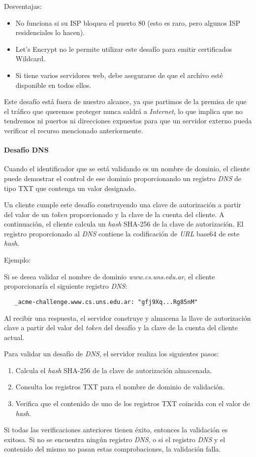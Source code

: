 Desventajas:
\begin{itemize}
   \setlength\itemsep{-0.6em}
   \item No funciona si su ISP bloquea el puerto 80 (esto es raro, pero algunos ISP residenciales lo hacen).
   \item Let's Encrypt no le permite utilizar este desafío para emitir certificados Wildcard.
   \item Si tiene varios servidores web, debe asegurarse de que el archivo esté disponible en todos ellos.
\end{itemize}
   
Este desafío está fuera de nuestro alcance, ya que partimos de la premisa de que 
el tráfico que queremos proteger nunca saldrá a \emph{Internet}, lo que implica que no 
tendremos ni puertos ni direcciones expuestas para que un servidor externo pueda 
verificar el recurso mencionado anteriormente. 


\paragraph*{Desafío DNS}
Cuando el identificador que se está validando es un nombre de dominio, el cliente 
puede demostrar el control de ese dominio proporcionando un registro \emph{DNS} de tipo 
TXT que contenga un valor designado.

Un cliente cumple este desafío construyendo una clave de autorización a partir del 
valor de un \emph{token} proporcionado y la clave de la cuenta del cliente. A continuación, el 
cliente calcula un \emph{hash} SHA-256 de la clave de 
autorización.
El registro proporcionado al \emph{DNS} contiene la codificación de \emph{URL} base64 de este 
\emph{hash}. 

\noindent Ejemplo:

Si se desea validar el nombre de dominio \textit{www.cs.uns.edu.ar}, el cliente 
proporcionaría el siguiente registro \emph{DNS}:

\begin{verbatim}
   _acme-challenge.www.cs.uns.edu.ar: "gfj9Xq...Rg85nM"
\end{verbatim}

Al recibir una respuesta, el servidor construye y almacena la llave de autorización
clave a partir del valor del \emph{token} del desafío y la clave de la cuenta del cliente actual.

\noindent Para validar un desafío de \emph{DNS}, el servidor realiza los siguientes pasos:

\begin{enumerate}
   \setlength\itemsep{-0.6em}
   \item Calcula el \emph{hash} SHA-256 de la clave de autorización almacenada.
   \item Consulta los registros TXT para el nombre de dominio de validación.
   \item Verifica que el contenido de uno de los registros TXT coincida con el valor de \emph{hash}.
\end{enumerate}

   
Si todas las verificaciones anteriores tienen éxito, entonces la validación es exitosa. 
Si no se encuentra ningún registro \emph{DNS}, o si el registro \emph{DNS} y el contenido del mismo 
no pasan estas comprobaciones, la validación falla.